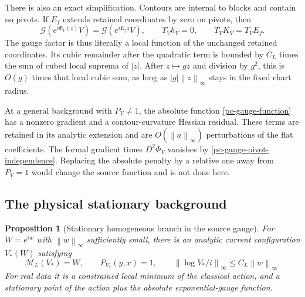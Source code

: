 \documentclass[11pt]{article}
\newtheorem{proposition}[theorem]{Proposition}
\newcommand{\norm}[1]{\left\|#1\right\|}
\begin{document}
There is also an exact simplification. Contours are internal to
blocks and contain no pivots. If $E_f$ extends retained
coordinates by zero on pivots, then
\begin{equation}\label{pc-gauge-pivot-independence}
 \mathcal G(e^{i\Phi_V(z)}V)=\mathcal G(e^{iE_fz}V),\qquad
 T_Vh_V=0,\qquad T_VK_V=T_VE_f.
\end{equation}
The gauge factor is thus literally a local function of the
unchanged retained coordinates. Its cubic remainder after the
quadratic term is bounded by $C_L$ times the sum of cubed local
suprema of $|z|$. After $z\mapsto gz$ and division by $g^2$,
this is $O(g)$ times that local cubic sum, as long as
$|g|\norm z_\infty$ stays in the fixed chart radius.

At a general background with $P_V\ne1$, the absolute function
\eqref{pc-gauge-function} has a nonzero gradient and a
contour-curvature Hessian residual. These terms are retained in
its analytic extension and are $O(\norm a_\infty)$ perturbations
of the flat coefficients. The formal gradient times
$D^2\Phi_V$ vanishes by
\eqref{pc-gauge-pivot-independence}. Replacing the absolute
penalty by a relative one away from $P_V=1$ would change the
source function and is not done here.

\subsection{The physical stationary background}
\label{pc-stationary-section}

\begin{proposition}[Stationary homogeneous branch in the source gauge]
\label{pc-stationary}
For $W=e^{iw}$ with $\norm w_\infty$ sufficiently small, there
is an analytic current configuration $V_*(W)$ satisfying
\begin{equation}\label{pc-stationary-identities}
 \mathcal M_L(V_*)=W,\qquad P_{V_*}(y,x)=1,\qquad
 \norm{\log V_*/i}_\infty\le C_L\norm w_\infty.
\end{equation}
For real data it is a constrained local minimum of the
classical action, and a stationary point of the action plus
the absolute exponential-gauge function.
\end{proposition}
\end{document}
